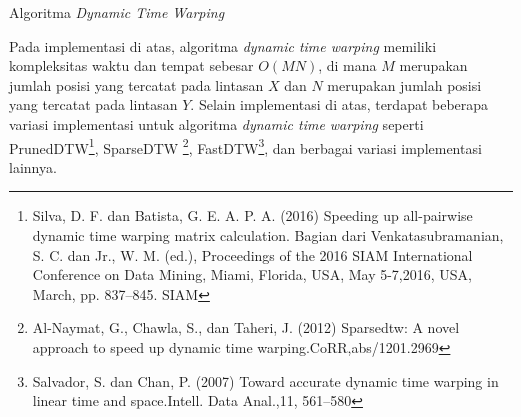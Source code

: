 \documentclass[a4paper,twoside]{article}
\begin{document}
\begin{algorithm}
    \caption{Algoritma \textit{Dynamic Time Warping}}
    \DontPrintSemicolon
 
  
    
    \label{bab2:dtw-pseudocode}
\end{algorithm}

Pada implementasi di atas, algoritma \textit{dynamic time warping} memiliki kompleksitas waktu dan tempat sebesar $O(MN)$, di mana $M$ merupakan jumlah posisi yang tercatat pada lintasan $X$ dan $N$ merupakan jumlah posisi yang tercatat pada lintasan $Y$. Selain implementasi di atas, terdapat beberapa variasi implementasi untuk algoritma \textit{dynamic time warping} seperti PrunedDTW\footnote{Silva, D. F. dan Batista, G. E. A. P. A. (2016) Speeding up all-pairwise dynamic time warping matrix calculation. Bagian dari Venkatasubramanian, S. C. dan Jr., W. M. (ed.), Proceedings of the 2016 SIAM International Conference on Data Mining, Miami, Florida, USA, May 5-7,2016, USA, March, pp. 837–845. SIAM}, SparseDTW \footnote{Al-Naymat, G., Chawla, S., dan Taheri, J. (2012) Sparsedtw: A novel approach to speed up dynamic time warping.CoRR,abs/1201.2969}, FastDTW\footnote{Salvador, S. dan Chan, P. (2007) Toward accurate dynamic time warping in linear time and space.Intell. Data Anal.,11, 561–580}, dan berbagai variasi implementasi lainnya.
\end{document}
